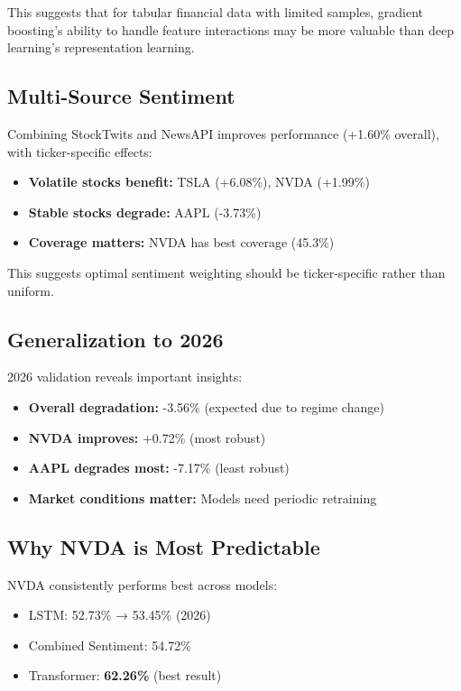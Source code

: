 \documentclass[10pt,twocolumn]{article}
\begin{document}
This suggests that for tabular financial data with limited samples, gradient boosting's ability to handle feature interactions may be more valuable than deep learning's representation learning.

\subsection{Multi-Source Sentiment}

Combining StockTwits and NewsAPI improves performance (+1.60\% overall), with ticker-specific effects:

\begin{itemize}
\item \textbf{Volatile stocks benefit:} TSLA (+6.08\%), NVDA (+1.99\%)
\item \textbf{Stable stocks degrade:} AAPL (-3.73\%)
\item \textbf{Coverage matters:} NVDA has best coverage (45.3\%)
\end{itemize}

This suggests optimal sentiment weighting should be ticker-specific rather than uniform.

\subsection{Generalization to 2026}

2026 validation reveals important insights:

\begin{itemize}
\item \textbf{Overall degradation:} -3.56\% (expected due to regime change)
\item \textbf{NVDA improves:} +0.72\% (most robust)
\item \textbf{AAPL degrades most:} -7.17\% (least robust)
\item \textbf{Market conditions matter:} Models need periodic retraining
\end{itemize}

\subsection{Why NVDA is Most Predictable}

NVDA consistently performs best across models:
\begin{itemize}
\item LSTM: 52.73\% → 53.45\% (2026)
\item Combined Sentiment: 54.72\%
\item Transformer: \textbf{62.26\%} (best result)
\end{itemize}
\end{document}
